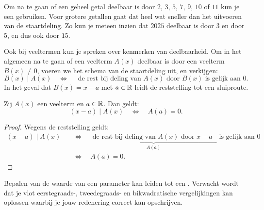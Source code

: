 \documentclass{ximera}
\begin{document}
	\author{Koen De Naeghel}
	\label{xim:veeltermen_kenmerken_van_deelbaarheid}


Om na te gaan of een geheel getal deelbaar is door $2$, $3$, $5$, $7$, $9$, $10$ of $11$ kun je een  gebruiken. Voor grotere getallen gaat dat heel wat sneller dan het uitvoeren van de staartdeling. Zo kun je meteen inzien dat $2025$ deelbaar is door $3$ en door $5$, en dus ook door $15$.  

Ook bij veeltermen kun je spreken over kenmerken van deelbaarheid. Om in het algemeen na te gaan of een veelterm $A(x)$ deelbaar is door een veelterm $B(x) \neq 0$, voeren we het schema van de staartdeling uit, en verkijgen:
\[
B(x) \mid A(x) \quad \Leftrightarrow \quad \text{ de rest bij deling van $A(x)$ door $B(x)$ is gelijk aan $0$.}
\] 
In het geval dat $B(x) = x-a$ met $a \in \mathbb{R}$ leidt de reststelling tot een sluiproute.

\begin{stelling}\label{stelling:kenmerkvandeelbaarheid}
Zij $A(x)$ een veelterm en $a \in \mathbb{R}$. Dan geldt:
\[
(x-a) \mid A(x) \quad \Leftrightarrow \quad A(a) = 0.
\]
\end{stelling}
\begin{proof}
Wegens de reststelling geldt:
\begin{align}
(x-a) \mid A(x) \quad 
& \Leftrightarrow \quad \underbrace{\text{ de rest bij deling van $A(x)$ door $x-a$ }}_{A(a)} \text{ is gelijk aan $0$} \nonumber \\
& \Leftrightarrow \quad A(a) = 0. \tag*{\qedhere}
\end{align}
\end{proof}

Bepalen van de waarde van een parameter kan leiden tot een . Verwacht wordt dat je vlot eerstegraads-, tweedegraads- en bikwadratische vergelijkingen kan oplossen waarbij je jouw redenering correct kan opschrijven. 
\end{document}
